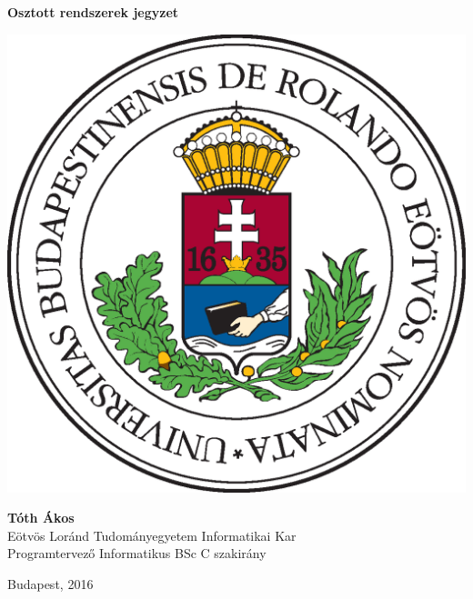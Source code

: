 \documentclass[12pt]{article}
\title{\DocTitle}
\author{\DocAuthor}
\date{\CurrentDate}
\def\DocTitle{Osztott rendszerek jegyzet}
\def\DocAuthor{Tóth Ákos}
\def\CurrentDate{2016}
\begin{document}
\setlength{\parindent}{1.5em}
\setlength{\parskip}{1.0em}
\setlength{\itemsep}{0.5em}
\renewcommand{\baselinestretch}{1.0}
\pagestyle{empty}
\begin{titlepage}
    \begin{center}
        \Huge
        \textbf{\DocTitle}
        \normalsize
    \end{center}
    \vfill
    \begin{center}
        \includegraphics[scale=1.0]{images/elte_cimer_szines.eps}
    \end{center}
    \vfill
    \begin{minipage}{1.0\linewidth}
        \begin{flushright}
            \textbf{\DocAuthor} \\
            Eötvös Loránd Tudományegyetem Informatikai Kar \\
            Programtervező Informatikus BSc C szakirány
        \end{flushright}
    \end{minipage}
    \vfill
    \begin{center}
        Budapest, \CurrentDate
    \end{center}
\end{titlepage}
\pagestyle{plain}
\setcounter{page}{1}
\end{document}
